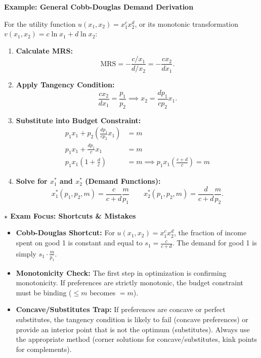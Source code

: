 \documentclass{article}
\begin{document}
\vspace{1em}
\noindent\textbf{Example: General Cobb-Douglas Demand Derivation}
\vspace{0.5em}

\noindent For the utility function $u(x_1, x_2) = x_1^c x_2^d$, or its monotonic transformation $v(x_1, x_2) = c \ln x_1 + d \ln x_2$:
\begin{enumerate}
    \item \textbf{Calculate MRS:} \[ \text{MRS} = -\frac{c/x_1}{d/x_2} = -\frac{c x_2}{d x_1}. \]
    \item \textbf{Apply Tangency Condition:} \[ \frac{c x_2}{d x_1} = \frac{p_1}{p_2} \implies x_2 = \frac{d p_1}{c p_2} x_1. \]
    \item \textbf{Substitute into Budget Constraint:} 
    \begin{align*} 
    p_1 x_1 + p_2 \left(\frac{d p_1}{c p_2} x_1\right) &= m \\ 
    p_1 x_1 + \frac{d p_1}{c} x_1 &= m \\ 
    p_1 x_1 \left(1 + \frac{d}{c}\right) &= m \implies p_1 x_1 \left(\frac{c+d}{c}\right) = m 
    \end{align*}
    \item \textbf{Solve for $x_1^*$ and $x_2^*$ (Demand Functions):} \[ x_1^*(p_1, p_2, m) = \frac{c}{c+d} \frac{m}{p_1} \qquad x_2^*(p_1, p_2, m) = \frac{d}{c+d} \frac{m}{p_2}. \]
\end{enumerate}

\vspace{0.5em}
\hrulefill
\vspace{0.5em}

\noindent\textbf{$\star$ Exam Focus: Shortcuts \& Mistakes}
\begin{itemize}
    \item \textbf{Cobb-Douglas Shortcut:} For $u(x_1, x_2) = x_1^c x_2^d$, the fraction of income spent on good 1 is constant and equal to $s_1 = \frac{c}{c+d}$. The demand for good 1 is simply $s_1 \cdot \frac{m}{p_1}$.
    \item \textbf{Monotonicity Check:} The first step in optimization is confirming monotonicity. If preferences are strictly monotonic, the budget constraint must be binding ($\leq m$ becomes $= m$).
    \item \textbf{Concave/Substitutes Trap:} If preferences are concave or perfect substitutes, the tangency condition is likely to fail (concave preferences) or provide an interior point that is not the optimum (substitutes). Always use the appropriate method (corner solutions for concave/substitutes, kink points for complements).
\end{itemize}
\end{document}
